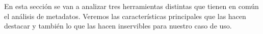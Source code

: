 En esta sección se van a analizar tres herramientas distintas que tienen en común el análisis de metadatos. Veremos las características principales que las hacen destacar y también lo que las hacen inservibles para nuestro caso de uso.